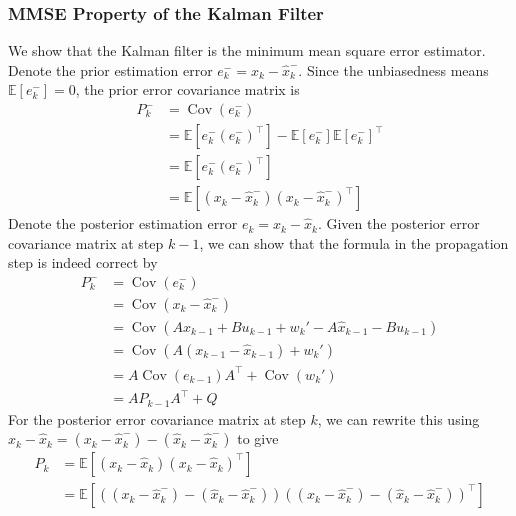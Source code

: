 \documentclass[11pt]{report} %
\begin{document}
\subsubsection{MMSE Property of the Kalman Filter}

We show that the Kalman filter is the minimum mean square error estimator. Denote the prior estimation error $e_{k}^{-} = x_{k} - \hat{x}_{k}^{-}$. Since the unbiasedness means $\mathbb{E}\left[e_{k}^{-}\right] = 0$, the prior error covariance matrix is
\begin{align}
P_{k}^{-} &= \operatorname{Cov}\left(e_{k}^{-}\right) \\
&= \mathbb{E}\left[e_{k}^{-}\left(e_{k}^{-}\right)^{\top}\right] - \mathbb{E}\left[e_{k}^{-}\right]\mathbb{E}\left[e_{k}^{-}\right]^{\top} \\
&= \mathbb{E}\left[e_{k}^{-}\left(e_{k}^{-}\right)^{\top}\right] \\
&= \mathbb{E}\left[\left(x_{k} - \hat{x}_{k}^{-}\right)\left(x_{k} - \hat{x}_{k}^{-}\right)^{\top}\right]
\end{align}
Denote the posterior estimation error $e_{k} = x_{k} - \hat{x}_{k}$. Given the posterior error covariance matrix at step $k - 1$, we can show that the formula in the propagation step is indeed correct by
\begin{align}
P_{k}^{-} &= \operatorname{Cov}\left(e_{k}^{-}\right) \\
&= \operatorname{Cov}\left(x_{k} - \hat{x}_{k}^{-}\right) \\
&= \operatorname{Cov}\left(Ax_{k - 1} + Bu_{k - 1} + w_{k}' - A\hat{x}_{k - 1} - Bu_{k - 1}\right) \\
&= \operatorname{Cov}\left(A\left(x_{k - 1} - \hat{x}_{k - 1}\right) + w_{k}'\right) \\
&= A\operatorname{Cov}\left(e_{k - 1}\right)A^{\top} + \operatorname{Cov}\left(w_{k}'\right) \\
&= AP_{k - 1}A^{\top} + Q
\end{align}
For the posterior error covariance matrix at step $k$, we can rewrite this using $x_{k} - \hat{x}_{k} = \left(x_{k} - \hat{x}_{k}^{-}\right) - \left(\hat{x}_{k} - \hat{x}_{k}^{-}\right)$ to give
\begin{align}
P_{k} &= \mathbb{E}\left[\left(x_{k} - \hat{x}_{k}\right)\left(x_{k} - \hat{x}_{k}\right)^{\top}\right] \\
&= \mathbb{E}\left[\left(\left(x_{k} - \hat{x}_{k}^{-}\right) - \left(\hat{x}_{k} - \hat{x}_{k}^{-}\right)\right)\left(\left(x_{k} - \hat{x}_{k}^{-}\right) - \left(\hat{x}_{k} - \hat{x}_{k}^{-}\right)\right)^{\top}\right]
\end{align}
\end{document}
